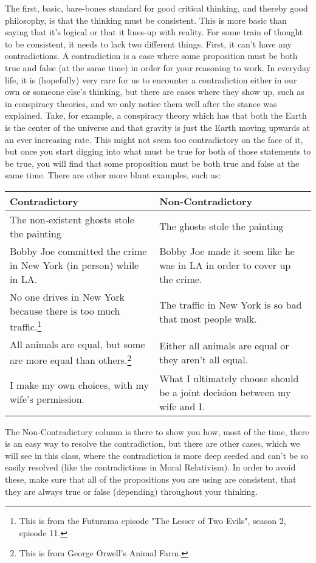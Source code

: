 The first, basic, bare-bones standard for good critical thinking, and thereby good philosophy, is that the thinking must be consistent. This is more basic than saying that it's logical or that it lines-up with reality. For some train of thought to be consistent, it needs to lack two different things. First, it can't have any contradictions. A contradiction is a case where some proposition must be both true and false (at the same time) in order for your reasoning to work. In everyday life, it is (hopefully) very rare for us to encounter a contradiction either in our own or someone else's thinking, but there are cases where they show up, such as in conspiracy theories, and we only notice them well after the stance was explained. Take, for example, a conspiracy theory which has that both the Earth is the center of the universe and that gravity is just the Earth moving upwards at an ever increasing rate. This might not seem too contradictory on the face of it, but once you start digging into what must be true for both of those statements to be true, you will find that some proposition must be both true and false at the same time. There are other more blunt examples, such as:

\begin{tabular}{p{1.5in}|p{1.5in}}
Contradictory &Non-Contradictory\\\hline
The non-existent ghosts stole the painting &The ghosts stole the painting\\\hline
Bobby Joe committed the crime in New York (in person) while in LA. &Bobby Joe made it seem like he was in LA in order to cover up the crime.\\\hline
No one drives in New York because there is too much traffic.\footnote{This is from the Futurama episode "The Lesser of Two Evils", season 2, episode 11.} &The traffic in New York is so bad that most people walk.\\\hline
All animals are equal, but some are more equal than others.\footnote{This is from George Orwell's Animal Farm.} &Either all animals are equal or they aren't all equal.\\\hline
I make my own choices, with my wife's permission. &What I ultimately choose should be a joint decision between my wife and I.\\\hline
\end{tabular}

The Non-Contradictory column is there to show you how, most of the time, there is an easy way to resolve the contradiction, but there are other cases, which we will see in this class, where the contradiction is more deep seeded and can't be so easily resolved (like the contradictions in Moral Relativism). In order to avoid these, make sure that all of the propositions you are using are consistent, that they are always true or false (depending) throughout your thinking.

